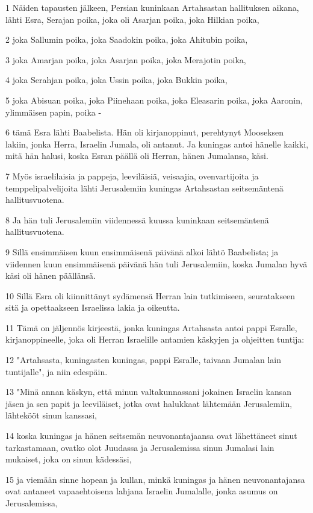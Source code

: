 \par 1 Näiden tapausten jälkeen, Persian kuninkaan Artahsastan hallituksen aikana, lähti Esra, Serajan poika, joka oli Asarjan poika, joka Hilkian poika,
\par 2 joka Sallumin poika, joka Saadokin poika, joka Ahitubin poika,
\par 3 joka Amarjan poika, joka Asarjan poika, joka Merajotin poika,
\par 4 joka Serahjan poika, joka Ussin poika, joka Bukkin poika,
\par 5 joka Abisuan poika, joka Piinehaan poika, joka Eleasarin poika, joka Aaronin, ylimmäisen papin, poika -
\par 6 tämä Esra lähti Baabelista. Hän oli kirjanoppinut, perehtynyt Mooseksen lakiin, jonka Herra, Israelin Jumala, oli antanut. Ja kuningas antoi hänelle kaikki, mitä hän halusi, koska Esran päällä oli Herran, hänen Jumalansa, käsi.
\par 7 Myös israelilaisia ja pappeja, leeviläisiä, veisaajia, ovenvartijoita ja temppelipalvelijoita lähti Jerusalemiin kuningas Artahsastan seitsemäntenä hallitusvuotena.
\par 8 Ja hän tuli Jerusalemiin viidennessä kuussa kuninkaan seitsemäntenä hallitusvuotena.
\par 9 Sillä ensimmäisen kuun ensimmäisenä päivänä alkoi lähtö Baabelista; ja viidennen kuun ensimmäisenä päivänä hän tuli Jerusalemiin, koska Jumalan hyvä käsi oli hänen päällänsä.
\par 10 Sillä Esra oli kiinnittänyt sydämensä Herran lain tutkimiseen, seuratakseen sitä ja opettaakseen Israelissa lakia ja oikeutta.
\par 11 Tämä on jäljennös kirjeestä, jonka kuningas Artahsasta antoi pappi Esralle, kirjanoppineelle, joka oli Herran Israelille antamien käskyjen ja ohjeitten tuntija:
\par 12 "Artahsasta, kuningasten kuningas, pappi Esralle, taivaan Jumalan lain tuntijalle", ja niin edespäin.
\par 13 "Minä annan käskyn, että minun valtakunnassani jokainen Israelin kansan jäsen ja sen papit ja leeviläiset, jotka ovat halukkaat lähtemään Jerusalemiin, lähtekööt sinun kanssasi,
\par 14 koska kuningas ja hänen seitsemän neuvonantajaansa ovat lähettäneet sinut tarkastamaan, ovatko olot Juudassa ja Jerusalemissa sinun Jumalasi lain mukaiset, joka on sinun kädessäsi,
\par 15 ja viemään sinne hopean ja kullan, minkä kuningas ja hänen neuvonantajansa ovat antaneet vapaaehtoisena lahjana Israelin Jumalalle, jonka asumus on Jerusalemissa,
